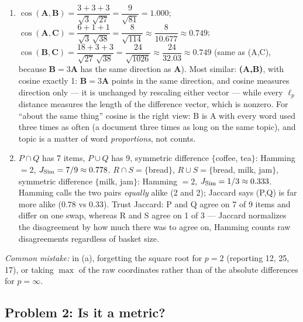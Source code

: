 \documentclass[
  11pt,
]{article}
\newcommand{\answerpage}{\clearpage}
\begin{document}
\begin{solutionbox}
\begin{enumerate}
\def\labelenumi{(\alph{enumi})}
\setcounter{enumi}{1}
\item
  \(\cos(\mathbf{A},\mathbf{B}) = \dfrac{3+3+3}{\sqrt3\,\sqrt{27}} = \dfrac{9}{\sqrt{81}} = 1.000\);
  \(\cos(\mathbf{A},\mathbf{C}) = \dfrac{6+1+1}{\sqrt3\,\sqrt{38}} = \dfrac{8}{\sqrt{114}} \approx \dfrac{8}{10.677} \approx 0.749\);
  \(\cos(\mathbf{B},\mathbf{C}) = \dfrac{18+3+3}{\sqrt{27}\,\sqrt{38}} = \dfrac{24}{\sqrt{1026}} \approx \dfrac{24}{32.03} \approx 0.749\)
  (same as (A,C), because \(\mathbf{B} = 3\mathbf{A}\) has the same
  direction as \(\mathbf{A}\)). Most similar: \textbf{(A,B)}, with
  cosine exactly 1: \(\mathbf{B} = 3\mathbf{A}\) points in the same
  direction, and cosine measures direction only --- it is unchanged by
  rescaling either vector --- while every \(\ell_p\) distance measures
  the length of the difference vector, which is nonzero. For ``about the
  same thing'' cosine is the right view: B is A with every word used
  three times as often (a document three times as long on the same
  topic), and topic is a matter of word \emph{proportions}, not counts.
\item
  \(P\cap Q\) has 7 items, \(P\cup Q\) has 9, symmetric difference
  \(\{\)coffee, tea\(\}\): Hamming \(=2\),
  \(J_{\rm Sim} = 7/9 \approx 0.778\). \(R\cap S = \{\)bread\(\}\),
  \(R\cup S = \{\)bread, milk, jam\(\}\), symmetric difference
  \(\{\)milk, jam\(\}\): Hamming \(=2\),
  \(J_{\rm Sim} = 1/3 \approx 0.333\). Hamming calls the two pairs
  \emph{equally} alike (2 and 2); Jaccard says (P,Q) is far more alike
  (\(0.78\) vs \(0.33\)). Trust Jaccard: P and Q agree on 7 of 9 items
  and differ on one swap, whereas R and S agree on 1 of 3 --- Jaccard
  normalizes the disagreement by how much there was to agree on, Hamming
  counts raw disagreements regardless of basket size.
\end{enumerate}

\emph{Common mistake:} in (a), forgetting the square root for \(p=2\)
(reporting 12, 25, 17), or taking \(\max\) of the raw coordinates rather
than of the absolute differences for \(p=\infty\).

\end{solutionbox}

\answerpage

\subsection{Problem 2: Is it a metric?}\label{problem-2-is-it-a-metric}
\end{document}
